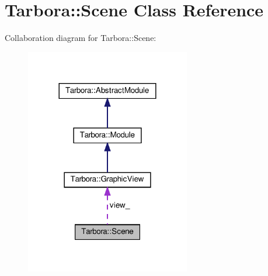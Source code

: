 \hypertarget{classTarbora_1_1Scene}{}\section{Tarbora\+:\+:Scene Class Reference}
\label{classTarbora_1_1Scene}


Collaboration diagram for Tarbora\+:\+:Scene\+:
\nopagebreak
\begin{figure}[H]
\begin{center}
\leavevmode
\includegraphics[width=204pt]{classTarbora_1_1Scene__coll__graph}
\end{center}
\end{figure}
